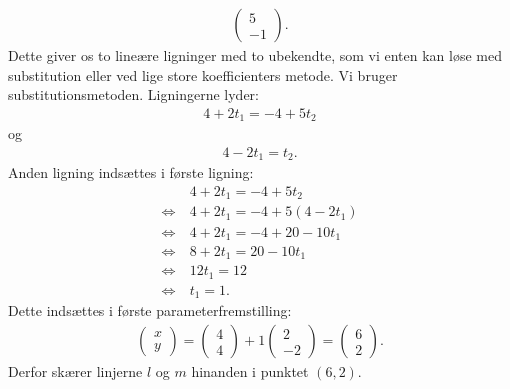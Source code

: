 \begin{exa}
\begin{align*}
\begin{pmatrix}
			5 \\ -1
		\end{pmatrix}.
	\end{align*}
	Dette giver os to lineære ligninger med to ubekendte, som vi enten kan løse med 
	substitution eller ved lige store koefficienters metode. Vi bruger substitutionsmetoden. 
	Ligningerne lyder:
	\begin{align*}
		4 + 2t_1 = -4+5t_2
	\end{align*} og
	\begin{align*}
		4-2t_1 = t_2.
	\end{align*}
	Anden ligning indsættes i første ligning:
	\begin{align*}
		&4 + 2t_1 = -4+5t_2\\
		\Leftrightarrow \ &4 + 2t_1 = -4+5(4-2t_1)\\
		\Leftrightarrow \ &4+2t_1 = -4+20-10t_1\\
		\Leftrightarrow \ &8+2t_1 = 20-10t_1\\
		\Leftrightarrow \ &12t_1 = 12\\
		\Leftrightarrow \ &t_1 = 1.
	\end{align*}
	Dette indsættes i første parameterfremstilling:
	\begin{align*}
		\begin{pmatrix}
			x \\ y
		\end{pmatrix} = 
		\begin{pmatrix}
			4 \\ 4 
		\end{pmatrix} 
		+ 1
		\begin{pmatrix}
			2 \\ -2
		\end{pmatrix} = 
		\begin{pmatrix}
			6 \\ 2
		\end{pmatrix}.
	\end{align*}
	Derfor skærer linjerne $l$ og $m$ hinanden i punktet $(6,2)$. 
\end{exa}


